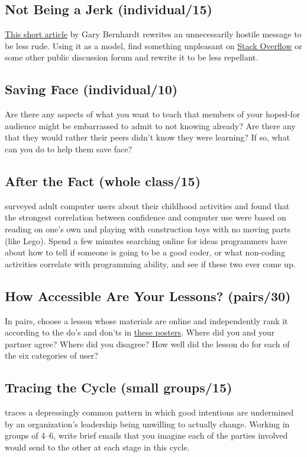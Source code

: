 \subsection{Not Being a Jerk (individual/15)}\label{not-being-a-jerk-individual15}

\href{https://www.destroyallsoftware.com/blog/2018/a-case-study-in-not-being-a-jerk-in-open-source}{This short article} by Gary Bernhardt rewrites an
unnecessarily hostile message to be less rude. Using it as a model,
find something unpleasant on \href{https://stackoverflow.com/}{Stack Overflow} or some
other public discussion forum and rewrite it to be less repellant.

\subsection{Saving Face (individual/10)}\label{saving-face-individual10}

Are there any aspects of what you want to teach that members of your
hoped-for audience might be embarrassed to admit to not knowing already?
Are there any that they would rather their peers didn't know they were
learning? If so, what can you do to help them save face?

\subsection{After the Fact (whole class/15)}\label{after-the-fact-whole-class15}

\cite{Cutt2017} surveyed adult computer users about their childhood
activities and found that the strongest correlation between confidence
and computer use were based on reading on one's own and playing with
construction toys with no moving parts (like Lego). Spend a few minutes
searching online for ideas programmers have about how to tell if someone
is going to be a good coder, or what non-coding activities correlate
with programming ability, and see if these two ever come up.

\subsection{How Accessible Are Your Lessons? (pairs/30)}\label{how-accessible-are-your-lessons-pairs30}

In pairs, choose a lesson whose materials are online and independently
rank it according to the do's and don'ts in \href{https://accessibility.blog.gov.uk/2016/09/02/dos-and-donts-on-designing-for-accessibility/}{these
posters}. Where did you and your partner
agree? Where did you disagree? How well did the lesson do for each of
the six categories of user?

\subsection{Tracing the Cycle (small groups/15)}\label{tracing-the-cycle-small-groups15}

\cite{Coco2018} traces a depressingly common pattern in which good
intentions are undermined by an organization's leadership being
unwilling to actually change. Working in groups of 4--6, write brief
emails that you imagine each of the parties involved would send to the
other at each stage in this cycle.
